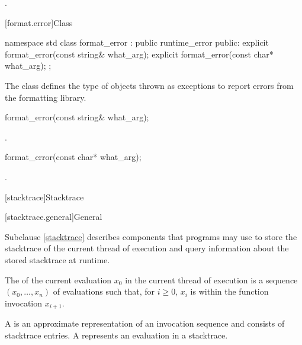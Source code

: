 \begin{itemdescr}
\pnum
\returns
{}.
\end{itemdescr}

[format.error]{Class }

%
\begin{codeblock}
namespace std {
  class format_error : public runtime_error {
  public:
    explicit format_error(const string& what_arg);
    explicit format_error(const char* what_arg);
  };
}
\end{codeblock}

\pnum
The class  defines the type of objects thrown as
exceptions to report errors from the formatting library.

%
\begin{itemdecl}
format_error(const string& what_arg);
\end{itemdecl}

\begin{itemdescr}
\pnum
\ensures
{}.

%
\end{itemdescr}
\begin{itemdecl}
format_error(const char* what_arg);
\end{itemdecl}

\begin{itemdescr}
\pnum
\ensures
{}.
\end{itemdescr}

[stacktrace]{Stacktrace}

[stacktrace.general]{General}

\pnum
Subclause \ref{stacktrace} describes components
that \Cpp{} programs may use to store
the stacktrace of the current thread of execution and
query information about the stored stacktrace at runtime.

\pnum
The  of the current evaluation $x_0$
in the current thread of execution
is a sequence $(x_0, \ldots, x_n)$ of evaluations such that, for $i \geq 0$,
$x_i$ is within the function invocation $x_{i+1}$.

\pnum
A  is an approximate representation of
an invocation sequence and consists of stacktrace entries.
A  represents an evaluation in a stacktrace.


